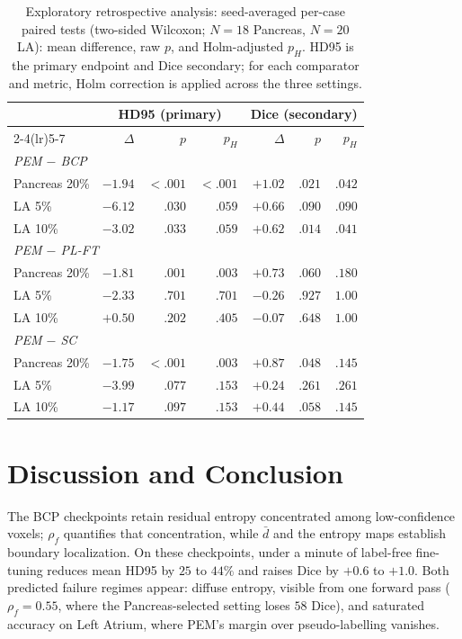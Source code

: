 \documentclass[conference]{IEEEtran}
\begin{document}
\begin{table}[tb]
\centering
\caption{Exploratory retrospective analysis: seed-averaged per-case paired tests (two-sided Wilcoxon; $N{=}18$ Pancreas, $N{=}20$ LA): mean difference, raw $p$, and Holm-adjusted $p_H$. HD95 is the primary endpoint and Dice secondary; for each comparator and metric, Holm correction is applied across the three settings.}
\label{tab:sig}
\scriptsize
\renewcommand{\arraystretch}{0.86}
\setlength{\tabcolsep}{3pt}
\begin{tabular}{lrrrrrr}
\toprule
 & \multicolumn{3}{c}{\textbf{HD95} (primary)} & \multicolumn{3}{c}{\textbf{Dice} (secondary)} \\
\cmidrule(lr){2-4}\cmidrule(lr){5-7}
 & $\Delta$ & $p$ & $p_H$ & $\Delta$ & $p$ & $p_H$ \\
\midrule
\multicolumn{7}{l}{\textit{PEM $-$ BCP}} \\
Pancreas 20\% & $-1.94$ & $<.001$ & $<.001$ & $+1.02$ & $.021$ & $.042$ \\
LA 5\%        & $-6.12$ & $.030$ & $.059$ & $+0.66$ & $.090$ & $.090$ \\
LA 10\%       & $-3.02$ & $.033$ & $.059$ & $+0.62$ & $.014$ & $.041$ \\
\multicolumn{7}{l}{\textit{PEM $-$ PL-FT}} \\
Pancreas 20\% & $-1.81$ & $.001$ & $.003$ & $+0.73$ & $.060$ & $.180$ \\
LA 5\%        & $-2.33$ & $.701$ & $.701$ & $-0.26$ & $.927$ & $1.00$ \\
LA 10\%       & $+0.50$ & $.202$ & $.405$ & $-0.07$ & $.648$ & $1.00$ \\
\multicolumn{7}{l}{\textit{PEM $-$ SC}} \\
Pancreas 20\% & $-1.75$ & $<.001$ & $.003$ & $+0.87$ & $.048$ & $.145$ \\
LA 5\%        & $-3.99$ & $.077$ & $.153$ & $+0.24$ & $.261$ & $.261$ \\
LA 10\%       & $-1.17$ & $.097$ & $.153$ & $+0.44$ & $.058$ & $.145$ \\
\bottomrule
\end{tabular}
\end{table}

\section{Discussion and Conclusion}
\label{sec:conclusion}
The BCP checkpoints retain residual entropy concentrated among low-confidence voxels; $\rho_f$ quantifies that concentration, while $\bar d$ and the entropy maps establish boundary localization. On these checkpoints, under a minute of label-free fine-tuning reduces mean HD95 by $25$ to $44\%$ and raises Dice by $+0.6$ to $+1.0$. Both predicted failure regimes appear: diffuse entropy, visible from one forward pass ($\rho_f=0.55$, where the Pancreas-selected setting loses $58$ Dice), and saturated accuracy on Left Atrium, where PEM's margin over pseudo-labelling vanishes.
\end{document}
